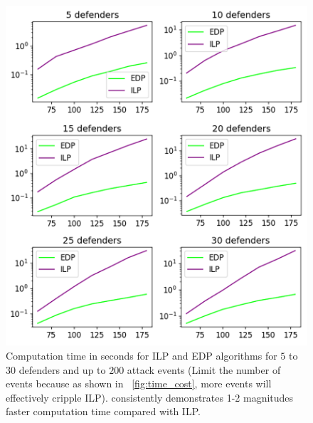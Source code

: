\begin{figure}[h!]
    \centering
    \includegraphics[width=\linewidth]{chapters/pd/fig/def_timecost-v.png}
    \caption{Computation time in seconds for ILP and EDP algorithms for $5$ to $30$ defenders and up to $200$ attack events (Limit the number of events because as shown in ~\ref{fig:time_cost}, more events will effectively cripple ILP). \ours consistently demonstrates 1-2 magnitudes faster computation time compared with ILP.}
    \label{fig:def_time_cost}
\end{figure}


